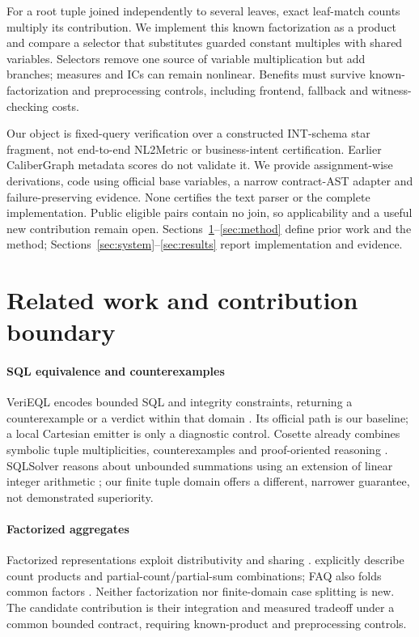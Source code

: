 \documentclass[3p,times,authoryear]{elsarticle}
\begin{document}
For a root tuple joined independently to several leaves, exact leaf-match counts multiply its contribution. We implement this known factorization as a product and compare a selector that substitutes guarded constant multiples with shared variables. Selectors remove one source of variable multiplication but add branches; measures and ICs can remain nonlinear. Benefits must survive known-factorization and preprocessing controls, including frontend, fallback and witness-checking costs.

Our object is fixed-query verification over a constructed INT-schema star fragment, not end-to-end NL2Metric or business-intent certification. Earlier CaliberGraph metadata scores do not validate it. We provide assignment-wise derivations, code using official base variables, a narrow contract-AST adapter and failure-preserving evidence. None certifies the text parser or the complete implementation. Public eligible pairs contain no join, so applicability and a useful new contribution remain open. Sections~\ref{sec:related}--\ref{sec:method} define prior work and the method; Sections~\ref{sec:system}--\ref{sec:results} report implementation and evidence.

\section{Related work and contribution boundary}\label{sec:related}
\paragraph{SQL equivalence and counterexamples}
VeriEQL encodes bounded SQL and integrity constraints, returning a counterexample or a verdict within that domain \citep{he2024verieql}. Its official path is our baseline; a local Cartesian emitter is only a diagnostic control. Cosette already combines symbolic tuple multiplicities, counterexamples and proof-oriented reasoning \citep{chu2017cosette}. SQLSolver reasons about unbounded summations using an extension of linear integer arithmetic \citep{ding2023sqlsolver}; our finite tuple domain offers a different, narrower guarantee, not demonstrated superiority.

\paragraph{Factorized aggregates}
Factorized representations exploit distributivity and sharing \citep{olteanu2016factorized}. \citet{bakibayev2013aggregation} explicitly describe count products and partial-count/partial-sum combinations; FAQ also folds common factors \citep{abo2023faq}. Neither factorization nor finite-domain case splitting is new. The candidate contribution is their integration and measured tradeoff under a common bounded contract, requiring known-product and preprocessing controls.
\end{document}
